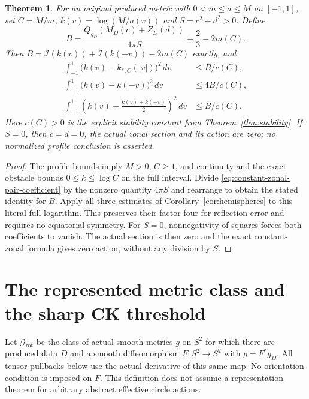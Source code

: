 \documentclass[11pt]{article}
\newtheorem{theorem}{Theorem}[section]
\newcommand{\I}{\mathcal I}
\begin{document}
\begin{theorem}\label{thm:geometric-hemisphere-stability}
For an original produced metric with $0<m\leq a\leq M$ on $[-1,1]$, set
$C=M/m$, $k(v)=\log(M/a(v))$ and $S=c^2+d^2>0$. Define
\begin{equation}\label{eq:geometric-stability-budget}
 B=\frac{Q_{g_D}(M_D(c)+Z_D(d))}{4\pi S}+\frac23-2m(C).
\end{equation}
Then $B=\I(k(v))+\I(k(-v))-2m(C)$ exactly, and
\begin{align*}
 \int_{-1}^1\bigl(k(v)-k_{*,C}(|v|)\bigr)^2\,dv&\leq B/c(C),\\
 \int_{-1}^1\bigl(k(v)-k(-v)\bigr)^2\,dv&\leq4B/c(C),\\
 \int_{-1}^1\left(k(v)-\frac{k(v)+k(-v)}2\right)^2\,dv&\leq B/c(C).
\end{align*}
Here $c(C)>0$ is the explicit stability constant from
Theorem~\ref{thm:stability}. If $S=0$, then $c=d=0$, the actual zonal
section and its action are zero; no normalized profile conclusion is asserted.
\end{theorem}

\begin{proof}
The profile bounds imply $M>0$, $C\geq1$, and continuity and the exact
obstacle bounds $0\leq k\leq\log C$ on the full interval.
Divide \eqref{eq:constant-zonal-pair-coefficient} by the nonzero quantity
$4\pi S$ and rearrange to obtain the stated identity for $B$.
Apply all three estimates of Corollary~\ref{cor:hemispheres} to this
literal full logarithm. This preserves their factor four for reflection
error and requires no equatorial symmetry.
For $S=0$, nonnegativity of squares forces both coefficients to vanish.
The actual section is then zero and the exact constant-zonal formula gives
zero action, without any division by $S$.
\end{proof}

\section{The represented metric class and the sharp CK threshold}

Let $\mathcal G_{\mathrm{rot}}$ be the class of actual smooth metrics $g$ on
$S^2$ for which there are produced data $D$ and a smooth diffeomorphism
$F:S^2\to S^2$ with $g=F^*g_D$. All tensor pullbacks below use the actual
derivative of this same map. No orientation condition is imposed on $F$.
This definition does not assume a representation theorem for arbitrary
abstract effective circle actions.
\end{document}
